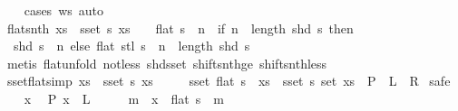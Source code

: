 \begin{isabellebody}
%
\isadelimproof
\ \ %
\endisadelimproof
%
\isatagproof
{}\isamarkupfalse%
\ {\isacharparenleft}cases\ ws{\isacharparenright}\ auto%
\endisatagproof
{\isafoldproof}%
%
\isadelimproof
\isanewline
%
\endisadelimproof
\isanewline
{}\isamarkupfalse%
\ flat{\isacharunderscore}snth{\isacharcolon}\ {\isachardoublequoteopen}{\isasymforall}xs\ {\isasymin}\ sset\ s{\isachardot}\ xs\ {\isasymnoteq}\ {\isacharbrackleft}{\isacharbrackright}\ {\isasymLongrightarrow}\ flat\ s\ {\isacharbang}{\isacharbang}\ n\ {\isacharequal}\ {\isacharparenleft}if\ n\ {\isacharless}\ length\ {\isacharparenleft}shd\ s{\isacharparenright}\ then\isanewline
\ \ shd\ s\ {\isacharbang}\ n\ else\ flat\ {\isacharparenleft}stl\ s{\isacharparenright}\ {\isacharbang}{\isacharbang}\ {\isacharparenleft}n\ {\isacharminus}\ length\ {\isacharparenleft}shd\ s{\isacharparenright}{\isacharparenright}{\isacharparenright}{\isachardoublequoteclose}\isanewline
%
\isadelimproof
\ \ %
\endisadelimproof
%
\isatagproof
{}\isamarkupfalse%
\ {\isacharparenleft}metis\ flat{\isacharunderscore}unfold\ not{\isacharunderscore}less\ shd{\isacharunderscore}sset\ shift{\isacharunderscore}snth{\isacharunderscore}ge\ shift{\isacharunderscore}snth{\isacharunderscore}less{\isacharparenright}%
\endisatagproof
{\isafoldproof}%
%
\isadelimproof
\isanewline
%
\endisadelimproof
\isanewline
{}\isamarkupfalse%
\ sset{\isacharunderscore}flat{\isacharbrackleft}simp{\isacharbrackright}{\isacharcolon}\ {\isachardoublequoteopen}{\isasymforall}xs\ {\isasymin}\ sset\ s{\isachardot}\ xs\ {\isasymnoteq}\ {\isacharbrackleft}{\isacharbrackright}\ {\isasymLongrightarrow}\isanewline
\ \ sset\ {\isacharparenleft}flat\ s{\isacharparenright}\ {\isacharequal}\ {\isacharparenleft}{\isasymUnion}xs\ {\isasymin}\ sset\ s{\isachardot}\ set\ xs{\isacharparenright}{\isachardoublequoteclose}\ {\isacharparenleft}\ {\isachardoublequoteopen}{\isacharquery}P\ {\isasymLongrightarrow}\ {\isacharquery}L\ {\isacharequal}\ {\isacharquery}R{\isachardoublequoteclose}{\isacharparenright}\isanewline
%
\isadelimproof
%
\endisadelimproof
%
\isatagproof
{}\isamarkupfalse%
\ safe\isanewline
\ \ \isamarkupfalse%
\ x\ \isamarkupfalse%
\ {\isacharquery}P\ {\isachardoublequoteopen}x\ {\isasymin}\ {\isacharquery}L{\isachardoublequoteclose}\isanewline
\ \ \isamarkupfalse%
\ \isamarkupfalse%
\ m\ \ {\isachardoublequoteopen}x\ {\isacharequal}\ flat\ s\ {\isacharbang}{\isacharbang}\ m{\isachardoublequoteclose}\ \isamarkupfalse%

\end{isabellebody}
